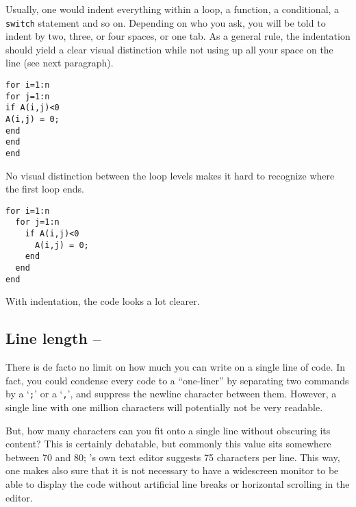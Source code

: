 Usually, one would indent everything within a loop, a function, a conditional,
a \lstinline!switch! statement and so on. Depending on who you ask, you will be
told to indent by two, three, or four spaces, or one tab. As a general rule,
the indentation should yield a clear visual distinction while not using up all
your space on the line (see next paragraph).

\hfill
\begin{minipage}[t]{.45\textwidth}
\begin{lstlisting}[framerule=2pt,rulecolor=\color{badred}]
for i=1:n
for j=1:n
if A(i,j)<0
A(i,j) = 0;
end
end
end
\end{lstlisting}
No visual distinction between the loop levels makes it hard to recognize where the first loop ends.\footnotemark
\end{minipage}
\hfill
\begin{minipage}[t]{.45\textwidth}
\begin{lstlisting}[framerule=2pt,rulecolor=\color{goodgreen}]
for i=1:n
  for j=1:n
    if A(i,j)<0
      A(i,j) = 0;
    end
  end
end
\end{lstlisting}
With indentation, the code looks a lot clearer.\footnotemark[\value{footnote}]
\end{minipage}
\hfill






\subsection{Line length -- \cleansymbol}
There is de facto no limit on how much you can write on a single line of
\matlab{} code. In fact, you could condense every \matlab{} code to a
``one-liner'' by separating two commands by a `\lstinline!;!' or a
`\lstinline!,!', and suppress the newline character between them. However, a
single line with one million characters will potentially not be very readable.

But, how many characters can you fit onto a single line without obscuring its
content? This is certainly debatable, but commonly this value sits somewhere
between 70 and 80; \matlab{}'s own text editor suggests 75 characters per
line. This way, one makes also sure that it is not necessary to have a
widescreen monitor to be able to display the code without artificial line
breaks or horizontal scrolling in the editor.


